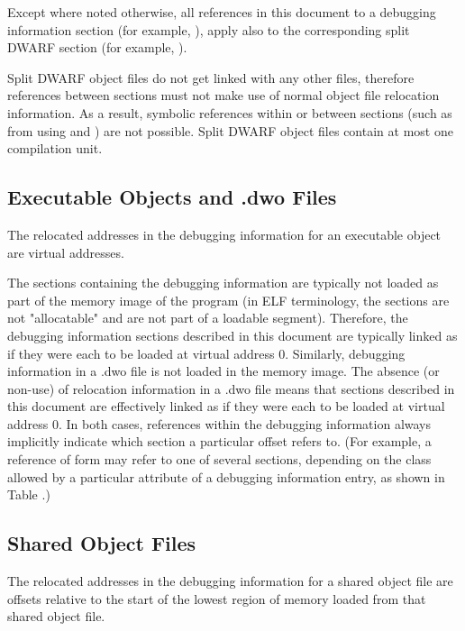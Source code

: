 Except where noted otherwise, all references in this document
to a debugging information section (for example, \dotdebuginfo),
apply also to the corresponding split DWARF section (for example,
\dotdebuginfodwo).

Split DWARF object files do not get linked with any other files,
therefore references between sections must not make use of
normal object file relocation information. As a result, symbolic
references within or between sections 
\bb
(such as from using \DWFORMrefaddr{} and \DWOPcallref)
\eb
are not possible.
\bb
Split DWARF object files contain at most one compilation unit.
\eb

\bb
\subsection{Executable Objects and .dwo Files}
\label{chap:executableobjectsanddwofiles}
\eb
The relocated addresses in the debugging information for an
executable object are virtual addresses.

The sections containing the debugging information are typically
not loaded as part of the memory image of the program (in ELF
terminology, the sections are not "allocatable" and are not part
of a loadable segment). Therefore, the debugging information
sections described in this document are typically linked as if
they were each to be loaded at virtual address 0.
\bb
Similarly,
debugging information in a .dwo file is not loaded in the memory image.
The absence (or non-use) of relocation information in a .dwo file means
that sections described in this document are effectively linked as if
they were each to be loaded at virtual address 0.
In both cases, references
\eb
within the debugging information always implicitly indicate which
section a particular offset refers to. (For example, a reference
of form \DWFORMsecoffset{} may refer to one of several sections,
depending on the class allowed by a particular attribute of a
debugging information entry, as shown in 
Table .)

\subsection{Shared Object Files}
\label{datarep:sharedobjectfiles}
The relocated
addresses in the debugging information for a shared object file
are offsets relative to the start of the lowest region of
memory loaded from that shared object file.

